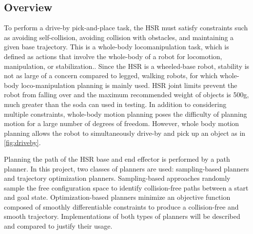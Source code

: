 \documentclass[12pt]{article}
\begin{document}
    \subsection{Overview}

        To perform a drive-by pick-and-place task, the HSR must satisfy constraints such as avoiding self-collision, avoiding collision with obstacles, and maintaining a given base trajectory. This is a whole-body locomanipulation task, which is defined as actions that involve the whole-body of a robot for locomotion, manipulation, or stabilization.\cite{kaiser_validation_2015}. Since the HSR is a wheeled-base robot, stability is not as large of a concern compared to legged, walking robots, for which whole-body loco-manipulation planning is mainly used. HSR joint limits prevent the robot from falling over and the maximum recommended weight of objects is 500g, much greater than the soda can used in testing.\cite{noauthor_hsrb_manual_nodate} In addition to considering multiple constraints, whole-body motion planning poses the difficulty of planning motion for a large number of degrees of freedom. However, whole body motion planning allows the robot to simultaneously drive-by and pick up an object as in \cref{fig:driveby}.
        \par Planning the path of the HSR base and end effector is performed by a path planner. In this project, two classes of planners are used: sampling-based planners and trajectory optimization planners. Sampling-based approaches randomly sample the free configuration space to identify collision-free paths between a start and goal state. Optimization-based planners minimize an objective function composed of smoothly differentiable constraints to produce a collision-free and smooth trajectory. Implementations of both types of planners will be described and compared to justify their usage.
    
\end{document}
